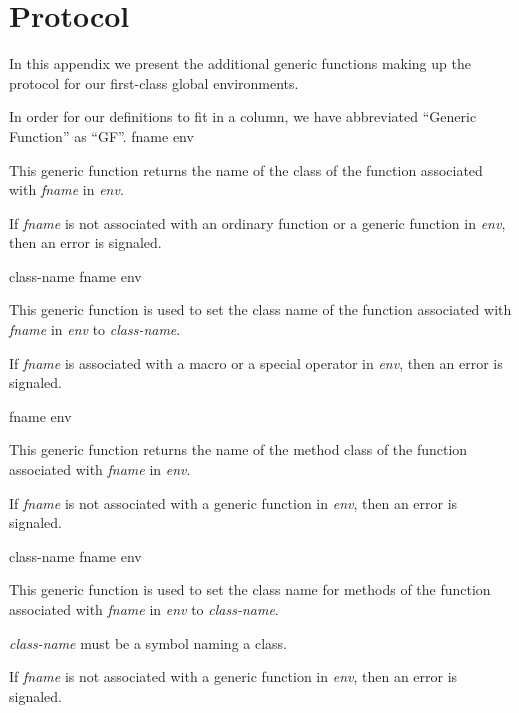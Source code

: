 \appendix

\section{Protocol}
\label{app-protocol}

In this appendix we present the additional generic functions making up
the protocol for our first-class global environments.

In order for our definitions to fit in a column, we have abbreviated
``Generic Function'' as ``GF''.
\vskip 0.2cm
\noindent
{} {fname env}

This generic function returns the name of the class of the function
associated with \textit{fname} in \textit{env}.

If \textit{fname} is not associated with an ordinary function or a
generic function in \textit{env}, then an error is signaled.

\vskip 0.2cm
\noindent
{} {class-name fname env}

This generic function is used to set the class name of the
function associated with \textit{fname} in \textit{env}
to \textit{class-name}.

If \textit{fname} is associated with a macro or a special operator
in \textit{env}, then an error is signaled.

\vskip 0.2cm
\noindent
{} {fname env}

This generic function returns the name of the method class of
the function associated with \textit{fname} in \textit{env}.

If \textit{fname} is not associated with a
generic function in \textit{env}, then an error is signaled.

\vskip 0.2cm
\noindent
{} {class-name fname env}

This generic function is used to set the class name for methods of
the function associated with \textit{fname} in
\textit{env} to \textit{class-name}.

\textit{class-name} must be a symbol naming a class.

If \textit{fname} is not associated with a
generic function in \textit{env}, then an error is signaled.
